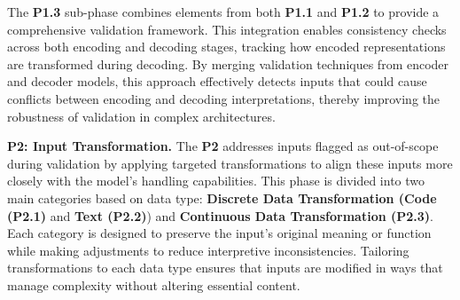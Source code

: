 The \textbf{P1.3} sub-phase combines elements from both \textbf{P1.1} and \textbf{P1.2} to provide a comprehensive validation framework. This integration enables consistency checks across both encoding and decoding stages, tracking how encoded representations are transformed during decoding. By merging validation techniques from encoder and decoder models, this approach effectively detects inputs that could cause conflicts between encoding and decoding interpretations, thereby improving the robustness of validation in complex architectures.


   
\textbf{P2: Input Transformation.}  The \textbf{P2} addresses inputs flagged as out-of-scope during validation by applying targeted transformations to align these inputs more closely with the model’s handling capabilities. This phase is divided into two main categories based on data type: \textbf{Discrete Data Transformation (Code (P2.1)} and \textbf{Text (P2.2)}) and \textbf{Continuous Data Transformation (P2.3)}. Each category is designed to preserve the input’s original meaning or function while making adjustments to reduce interpretive inconsistencies. Tailoring transformations to each data type ensures that inputs are modified in ways that manage complexity without altering essential content.


